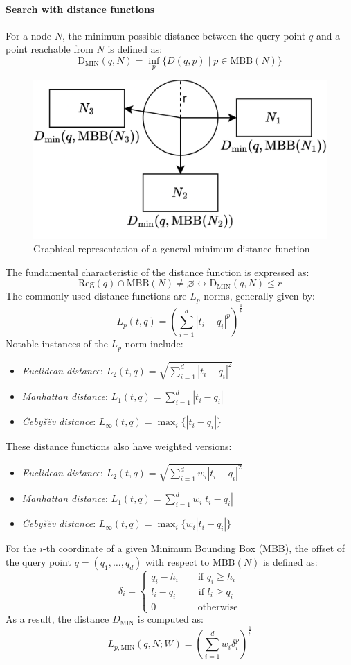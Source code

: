 \paragraph*{Search with distance functions}
For a node $N$, the minimum possible distance between the query point $q$ and a point reachable from $N$ is defined as:
\[\text{D}_{\text{MIN}}(q,N)=\inf_p\{D(q,p)\mid p \in \text{MBB}(N)\}\]
\begin{figure}[H]
    \centering
    \includegraphics[width=0.5\linewidth]{images/d.png}
    \caption{Graphical representation of a general minimum distance function}
\end{figure}
The fundamental characteristic of the distance function is expressed as:
\[\text{Reg}(q) \cap \text{MBB}(N) \neq \varnothing \leftrightarrow \text{D}_{\text{MIN}}(q,N) \leq r\]
The commonly used distance functions are $L_p$-norms, generally given by:
\[L_p(t,q)=\left( \sum_{i=1}^d \left\lvert t_i-q_i \right\rvert^p  \right)^{\frac{1}{p}}\]
Notable instances of the $L_p$-norm include:
\begin{itemize}
    \item \textit{Euclidean distance}: $L_2(t,q)=\sqrt{\sum_{i=1}^{d}{\left\lvert t_i-q_i \right\rvert^{2}}}$
    \item \textit{Manhattan distance}: $L_1(t,q)=\sum_{i=1}^{d}{\left\lvert t_i-q_i \right\rvert}$
    \item \textit{Čebyšëv distance}: $L_{\infty}(t,q)=\max_{i}\{\left\lvert t_i-q_i\right\rvert\}$
\end{itemize}
These distance functions also have weighted versions:
\begin{itemize}
    \item \textit{Euclidean distance}: $L_2(t,q)=\sqrt{\sum_{i=1}^{d}{w_i\left\lvert t_i-q_i \right\rvert^{2}}}$
    \item \textit{Manhattan distance}: $L_1(t,q)=\sum_{i=1}^{d}{w_i\left\lvert t_i-q_i \right\rvert}$
    \item \textit{Čebyšëv distance}: $L_{\infty}(t,q)=\max_{i}\{w_i\left\lvert t_i-q_i\right\rvert\}$
\end{itemize}
For the $i$-th coordinate of a given Minimum Bounding Box (MBB), the offset of the query point $q=(q_1,\dots,q_d)$ with respect to $\text{MBB}(N)$ is defined as:
\[ \delta_i=\begin{cases}
    q_i-h_i \qquad \text{if } q_i \geq h_i \\
    l_i-q_i \qquad \text{ if } l_i \geq q_i \\
    0 \qquad\qquad \text{  otherwise}
\end{cases}\]
As a result, the distance $D_{\text{MIN}}$ is computed as:
\[L_{p,\text{MIN}}(q,N;W)=\left( \sum_{i=1}^d{w_i\delta_i^p} \right)^{\frac{1}{p}}\]

